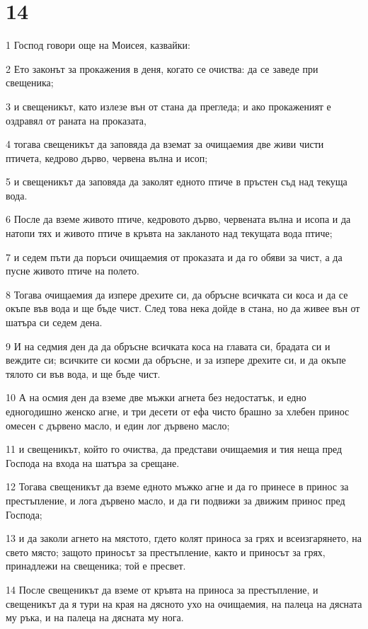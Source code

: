 \chapter{14}

\par 1 Господ говори още на Моисея, казвайки:
\par 2 Ето законът за прокажения в деня, когато се очиства: да се заведе при свещеника;
\par 3 и свещеникът, като излезе вън от стана да прегледа; и ако прокаженият е оздравял от раната на проказата,
\par 4 тогава свещеникът да заповяда да вземат за очищаемия две живи чисти птичета, кедрово дърво, червена вълна и исоп;
\par 5 и свещеникът да заповяда да заколят едното птиче в пръстен съд над текуща вода.
\par 6 После да вземе живото птиче, кедровото дърво, червената вълна и исопа и да натопи тях и живото птиче в кръвта на закланото над текущата вода птиче;
\par 7 и седем пъти да поръси очищаемия от проказата и да го обяви за чист, а да пусне живото птиче на полето.
\par 8 Тогава очищаемия да изпере дрехите си, да обръсне всичката си коса и да се окъпе във вода и ще бъде чист. След това нека дойде в стана, но да живее вън от шатъра си седем дена.
\par 9 И на седмия ден да да обръсне всичката коса на главата си, брадата си и веждите си; всичките си косми да обръсне, и за изпере дрехите си, и да окъпе тялото си във вода, и ще бъде чист.
\par 10 А на осмия ден да вземе две мъжки агнета без недостатък, и едно едногодишно женско агне, и три десети от ефа чисто брашно за хлебен принос омесен с дървено масло, и един лог дървено масло;
\par 11 и свещеникът, който го очиства, да представи очищаемия и тия неща пред Господа на входа на шатъра за срещане.
\par 12 Тогава свещеникът да вземе едното мъжко агне и да го принесе в принос за престъпление, и лога дървено масло, и да ги подвижи за движим принос пред Господа;
\par 13 и да заколи агнето на мястото, гдето колят приноса за грях и всеизгарянето, на свето място; защото приносът за престъпление, както и приносът за грях, принадлежи на свещеника; той е пресвет.
\par 14 После свещеникът да вземе от кръвта на приноса за престъпление, и свещеникът да я тури на края на дясното ухо на очищаемия, на палеца на дясната му ръка, и на палеца на дясната му нога.
